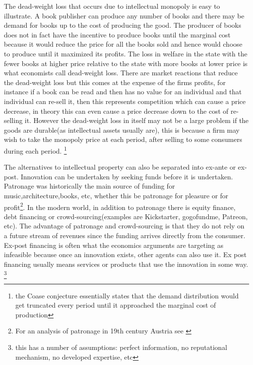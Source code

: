 \documentclass[12pt]{article}
\numberwithin{equation}{section}
\begin{document}
The dead-weight loss that occurs due to intellectual monopoly is easy to illustrate. A book publisher can produce any number of books and there may be demand for books up to the cost of producing the good. The producer of books does not in fact have the incentive to produce books until the marginal cost because it would reduce the price for all the books sold and hence would choose to produce until it maximized its profits. The loss in welfare in the state with the fewer books at higher price relative to the state with more books at lower price is what economists call dead-weight loss. There are market reactions that reduce the dead-weight loss but this comes at the expense of the firms profits, for instance if a book can be read and then has no value for an individual and that individual can re-sell it, then this represents competition which can cause a price decrease, in theory this can even cause a price decrease down to the cost of re-selling it. However the dead-weight loss in itself may not be a large problem if the goods are durable(as intellectual assets usually are), this is because a firm may wish to take the monopoly price at each period, after selling to some consumers during each period. \footnote{the Coase conjecture essentially states that the demand distribution would get truncated every period until it approached the marginal cost of production}%

The alternatives to intellectual property can also be separated into ex-ante or ex-post. Innovation can be undertaken by seeking funds before it is undertaken. Patronage was historically the main source of funding for music,architecture,books, etc, whether this be patronage for pleasure or for profit\footnote{For an analysis of patronage in 19th century Austria see \cite{carletti2013top} }. In the modern world, in addition to patronage there is equity finance, debt financing or crowd-sourcing(examples are Kickstarter, gogofundme, Patreon, etc). The advantage of patronage and crowd-sourcing is that they do not rely on a future stream of revenues since the funding arrives directly from the consumer. Ex-post financing is often what the economics arguments are targeting as infeasible because once an innovation exists, other agents can also use it. Ex post financing usually means services or products that use the innovation in some way. \footnote{ this has a number of assumptions: perfect information, no reputational mechanism, no developed expertise, etc }

\end{document}
